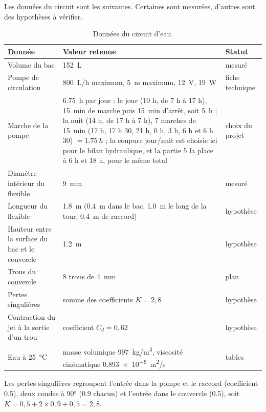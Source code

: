 Les données du circuit sont les suivantes. Certaines sont mesurées, d'autres sont des hypothèses à vérifier.

\begin{table}[H]
\centering
\small
\renewcommand{\arraystretch}{1.1}
\begin{tabularx}{\textwidth}{|>{\raggedright\arraybackslash}p{5.6cm}|Y|>{\raggedright\arraybackslash}p{2.6cm}|}
\hline
\textbf{Donnée} & \textbf{Valeur retenue} & \textbf{Statut} \\
\hline
Volume du bac & \qty{152}{L} & mesuré \\
\hline
Pompe de circulation & \qty{800}{L/h} maximum, \qty{5}{m} maximum, \qty{12}{V}, \qty{19}{W} & fiche technique \\
\hline
Marche de la pompe & \qty{6,75}{h} par jour : le jour (10 h, de 7 h à 17 h), \qty{15}{min} de marche puis \qty{15}{min} d'arrêt, soit \qty{5}{h} ; la nuit (14 h, de 17 h à 7 h), 7 marches de \qty{15}{min} (17 h, 17 h 30, 21 h, 0 h, 3 h, 6 h et 6 h 30) $= \qty{1,75}{h}$ ; la coupure jour/nuit est choisie ici pour le bilan hydraulique, et la partie 5 la place à 6 h et 18 h, pour le même total & choix du projet \\
\hline
Diamètre intérieur du flexible & \qty{9}{mm} & mesuré \\
\hline
Longueur du flexible & \qty{1,8}{m} (\qty{0,4}{m} dans le bac, \qty{1,0}{m} le long de la tour, \qty{0,4}{m} de raccord) & hypothèse \\
\hline
Hauteur entre la surface du bac et le couvercle & \qty{1,2}{m} & hypothèse \\
\hline
Trous du couvercle & 8 trous de \qty{4}{mm} & plan \\
\hline
Pertes singulières & somme des coefficients $K = 2,8$ & hypothèse \\
\hline
Contraction du jet à la sortie d'un trou & coefficient $C_d = 0,62$ & hypothèse \\
\hline
Eau à \qty{25}{\celsius} & masse volumique \qty{997}{kg/m^3}, viscosité cinématique \qty{0,893e-6}{m^2/s} & tables \\
\hline
\end{tabularx}
\caption{Données du circuit d'eau.}
\end{table}

Les pertes singulières regroupent l'entrée dans la pompe et le raccord (coefficient \num{0,5}), deux coudes à \ang{90} (\num{0,9} chacun) et l'entrée dans le couvercle (\num{0,5}), soit $K = 0,5 + 2 \times 0,9 + 0,5 = 2,8$.

